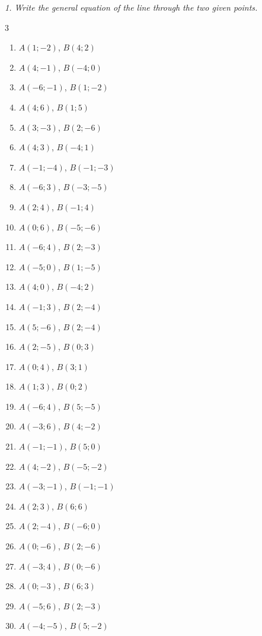 \emph{1. Write the general equation of the line through the two given points.}
\bigskip
\begin{multicols}{3}\raggedright
\begin{enumerate}[label=\arabic*., leftmargin=*]
\item $A(1;-2)$, $B(4;2)$
\item $A(4;-1)$, $B(-4;0)$
\item $A(-6;-1)$, $B(1;-2)$
\item $A(4;6)$, $B(1;5)$
\item $A(3;-3)$, $B(2;-6)$
\item $A(4;3)$, $B(-4;1)$
\item $A(-1;-4)$, $B(-1;-3)$
\item $A(-6;3)$, $B(-3;-5)$
\item $A(2;4)$, $B(-1;4)$
\item $A(0;6)$, $B(-5;-6)$
\item $A(-6;4)$, $B(2;-3)$
\item $A(-5;0)$, $B(1;-5)$
\item $A(4;0)$, $B(-4;2)$
\item $A(-1;3)$, $B(2;-4)$
\item $A(5;-6)$, $B(2;-4)$
\item $A(2;-5)$, $B(0;3)$
\item $A(0;4)$, $B(3;1)$
\item $A(1;3)$, $B(0;2)$
\item $A(-6;4)$, $B(5;-5)$
\item $A(-3;6)$, $B(4;-2)$
\item $A(-1;-1)$, $B(5;0)$
\item $A(4;-2)$, $B(-5;-2)$
\item $A(-3;-1)$, $B(-1;-1)$
\item $A(2;3)$, $B(6;6)$
\item $A(2;-4)$, $B(-6;0)$
\item $A(0;-6)$, $B(2;-6)$
\item $A(-3;4)$, $B(0;-6)$
\item $A(0;-3)$, $B(6;3)$
\item $A(-5;6)$, $B(2;-3)$
\item $A(-4;-5)$, $B(5;-2)$
\end{enumerate}
\end{multicols}

